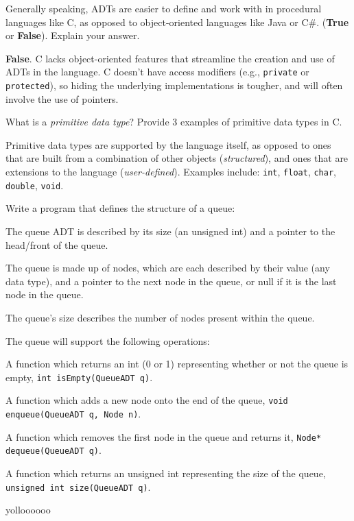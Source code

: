 
Generally speaking, ADTs are easier to define and work with in procedural languages like C, as opposed to object-oriented languages like Java or C\#. (\textbf{True} or \textbf{False}). Explain your answer.

\begin{answer} 
\textbf{False}. C lacks object-oriented features that streamline the creation and use of ADTs in the language. C doesn't have access modifiers (e.g., \texttt{private} or \texttt{protected}), so hiding the underlying implementations is tougher, and will often involve the use of pointers.
\end{answer}

\item What is a \emph{primitive data type}? Provide 3 examples of primitive data types in C.

\begin{answer}
Primitive data types are supported by the language itself, as opposed to ones that are built from a combination of other objects (\emph{structured}), and ones that are extensions to the language (\emph{user-defined}). Examples include: \texttt{int}, \texttt{float}, \texttt{char}, \texttt{double}, \texttt{void}.
\end{answer}

\item Write a program that defines the structure of a queue:
\begin{itemize} {\small
	\item The queue ADT is described by its size (an unsigned int) and a pointer to the head/front of the queue.
	\item The queue is made up of nodes, which are each described by their value (any data type), and a pointer to the next node in the queue, or null if it is the last node in the queue.
	\item The queue's size describes the number of nodes present within the queue.
	\item The queue will support the following operations:}
	\begin{itemize} {\scriptsize
		\item A function which returns an int (0 or 1) representing whether or not the queue is empty, \texttt{int isEmpty(QueueADT q)}.
		\item A function which adds a new node onto the end of the queue, \texttt{void enqueue(QueueADT q, Node n)}.
		\item A function which removes the first node in the queue and returns it, \texttt{Node* dequeue(QueueADT q)}.
		\item A function which returns an unsigned int representing the size of the queue, \texttt{unsigned int size(QueueADT q)}.}
	\end{itemize}
\end{itemize}

\begin{answer}
yolloooooo
\end{answer}



